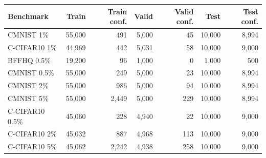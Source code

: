 \begin{tabular}{lrrrrrr}
\toprule
Benchmark & Train & Train conf. & Valid & Valid conf. & Test & Test conf. \\
\midrule
CMNIST 1\% & 55,000 & 491 & 5,000 & 45 & 10,000 & 8,994 \\
C-CIFAR10 1\% & 44,969 & 442 & 5,031 & 58 & 10,000 & 9,000 \\
BFFHQ 0.5\% & 19,200 & 96 & 1,000 & 0 & 1,000 & 500 \\
CMNIST 0.5\% & 55,000 & 249 & 5,000 & 23 & 10,000 & 8,994 \\
CMNIST 2\% & 55,000 & 986 & 5,000 & 94 & 10,000 & 8,994 \\
CMNIST 5\% & 55,000 & 2,449 & 5,000 & 229 & 10,000 & 8,994 \\
C-CIFAR10 0.5\% & 45,060 & 228 & 4,940 & 22 & 10,000 & 9,000 \\
C-CIFAR10 2\% & 45,032 & 887 & 4,968 & 113 & 10,000 & 9,000 \\
C-CIFAR10 5\% & 45,062 & 2,242 & 4,938 & 258 & 10,000 & 9,000 \\
\bottomrule
\end{tabular}
